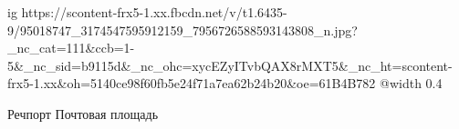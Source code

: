  
 
 
 
 

\ifcmt
  ig https://scontent-frx5-1.xx.fbcdn.net/v/t1.6435-9/95018747_3174547595912159_7956726588593143808_n.jpg?_nc_cat=111&ccb=1-5&_nc_sid=b9115d&_nc_ohc=xycEZyITvbQAX8rMXT5&_nc_ht=scontent-frx5-1.xx&oh=5140ce98f60fb5e24f71a7ea62b24b20&oe=61B4B782
  @width 0.4
\fi

Речпорт Почтовая площадь
